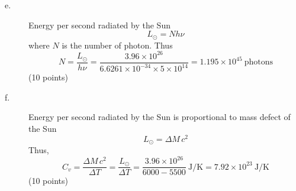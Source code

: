 \begin{description}
\item[e.] Energy per second radiated by the Sun
  \[
    L_\odot = Nh\nu
  \]
  where $N$ is the number of photon. Thus
  \[
    N = \frac{L_\odot}{h\nu}
      = \frac{3.96\times10^{26}}{6.6261\times10^{-34}\times 5\times10^{14}}
      = 1.195\times10^{45}\ \text{photons}
  \]
  \hfill(10 points)
\item[f.] Energy per second radiated by the Sun is proportional to mass defect
  of the Sun
  \[
    L_\odot = \Delta M\,c^2
  \]
  Thus,
  \[
    C_v = \frac{\Delta M\,c^2}{\Delta T} = \frac{L_\odot}{\Delta T}
        = \frac{3.96\times10^{26}}{6000 - 5500}\ \mathrm{J/K}
        = 7.92\times10^{23}\ \mathrm{J/K}
  \]
  \hfill(10 points)
\end{description}
